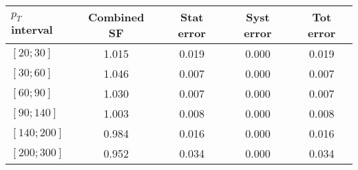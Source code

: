 

\begin{tabular}{|l|c|c|c|c|}
\hline 
 $p_{T}$ interval &  Combined SF & Stat error & Syst error & Tot error \\
\hline 
$[20;30]$ & 1.015 & 0.019 & 0.000 & 0.019 \\ 
$[30;60]$ & 1.046 & 0.007 & 0.000 & 0.007 \\ 
$[60;90]$ & 1.030 & 0.007 & 0.000 & 0.007 \\ 
$[90;140]$ & 1.003 & 0.008 & 0.000 & 0.008 \\ 
$[140;200]$ & 0.984 & 0.016 & 0.000 & 0.016 \\ 
$[200;300]$ & 0.952 & 0.034 & 0.000 & 0.034 \\ 
\hline 
\end{tabular} 
